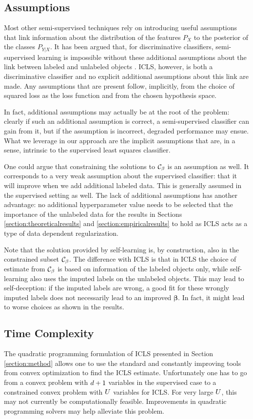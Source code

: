 \documentclass{elsarticle}
\begin{document}
\subsection*{Assumptions}
Most other semi-supervised techniques rely on introducing useful assumptions that link information about the distribution of the features $P_X$ to the posterior of the classes $P_{Y|X}$. It has been argued that, for discriminative classifiers, semi-supervised learning is impossible without these additional assumptions about the link between labeled and unlabeled objects \cite{Seeger2001,Singh2008}. ICLS, however, is both a discriminative classifier and no explicit additional assumptions about this link are made.  Any assumptions that are present follow, implicitly, from the choice of squared loss as the loss function and from the chosen hypothesis space.

In fact, additional assumptions may actually be at the root of the problem: clearly if such an additional assumption is correct, a semi-supervised classifier can gain from it, but if the assumption is incorrect, degraded performance may ensue.  What we leverage in our approach are the implicit assumptions that are, in a sense, intrinsic to the supervised least squares classifier. 

One could argue that constraining the solutions to $\mathcal{C}_{\beta}$ is an assumption as well. It corresponds to a very weak assumption about the supervised classifier: that it will improve when we add additional labeled data. This is generally assumed in the supervised setting as well. The lack of additional assumptions has another advantage: no additional hyperparameter value needs to be selected that the importance of the unlabeled data for the results in Sections \ref{section:theoreticalresults} and \ref{section:empiricalresults} to hold as ICLS acts as a type of data dependent regularization.

Note that the solution provided by self-learning is, by construction, also in the constrained subset $\mathcal{C}_{\beta}$. The difference with ICLS is that in ICLS the choice of estimate from $\mathcal{C}_{\beta}$ is based on information of the labeled objects only, while self-learning also uses the imputed labels on the unlabeled objects. This may lead to self-deception: if the imputed labels are wrong, a good fit for these wrongly imputed labels does not necessarily lead to an improved $\boldsymbol{\beta}$. In fact, it might lead to worse choices as shown in the results.

\subsection*{Time Complexity}
The quadratic programming formulation of ICLS presented in Section \ref{section:method} allows one to use the standard and constantly improving tools from convex optimization to find the ICLS estimate. Unfortunately one has to go from a convex problem with $d+1$ variables in the supervised case to a constrained convex problem with $U$ variables for ICLS. For very large $U$, this may not currently be computationally feasible. Improvements in quadratic programming solvers may help alleviate this problem. 
\end{document}
